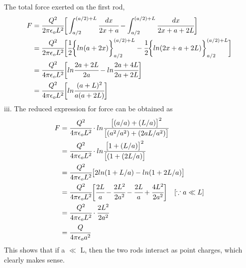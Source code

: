 The total force exerted on the first rod, 
\begin{align*}
    F &= \cfrac{Q^2}{2 \pi \epsilon_o L^2} \bigg[\int_{a/2}^{(a/2)+L}\cfrac{dx}{2x+a} - \int_{a/2}^{(a/2)+L}\cfrac{dx}{2x + a + 2L}\bigg ]\\
      &= \cfrac{Q^2}{2 \pi \epsilon_o L^2} \bigg[\cfrac{1}{2} \bigg\{ln(a+2x)\bigg\}_{a/2}^{(a/2)+L} - \cfrac{1}{2} \bigg\{ln (2x + a + 2L)\bigg\}_{a/2}^{(a/2)+L}\bigg]\\
      &= \cfrac{Q^2}{4 \pi \epsilon_o L^2} \bigg[ln\cfrac{2a +2L}{2a} - ln\cfrac{2a + 4L}{2a + 2L}\bigg]\\
      &= \cfrac{Q^2}{4 \pi \epsilon_o L^2} \bigg[ln\cfrac{(a + L)^2}{a(a + 2L)} \bigg]
\end{align*}
iii. The reduced expression for force can be obtained as
\begin{align*}
    F &= \cfrac{Q^2}{4 \pi \epsilon_o L^2} \cdot ln\cfrac{\big[(a/a) + (L/a)\big]^2} {\big[(a^2/a^2) + (2aL/a^2)\big]} \\
      &= \cfrac{Q^2}{4 \pi \epsilon_o L^2} \cdot ln\cfrac{\big[1 + (L/a)\big]^2} {\big[(1 + (2L/a)\big]}\\
      &= \cfrac{Q^2}{4 \pi \epsilon_o L^2} \big[2 ln(1 + L/a) - ln (1 + 2L/a)\big] \\
      &= \cfrac{Q^2}{4 \pi \epsilon_o L^2} \bigg[\cfrac{2L}{a} - \cfrac{2L^2}{2a^2} - \cfrac{2L}{a} + \cfrac{4L^2}{2a^2} \bigg ] \hspace{10pt} [\because a\ll L]\\
      &= \cfrac{Q^2}{4 \pi \epsilon_o L^2} \cdot \cfrac{2L^2}{2a^2}\\
      &= \cfrac{Q}{4 \pi \epsilon_o a^2}
\end{align*}
This shows that if a $\ll$ L, then the two rods interact as point charges, which clearly makes sense.

